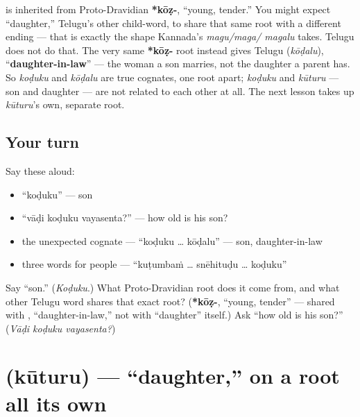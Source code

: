 \begin{cousinweb}
\textbf{} is inherited from Proto-Dravidian \textbf{*kōẓ-}, \textquotedblleft{}young, tender.\textquotedblright{} You might expect \textquotedblleft{}daughter,\textquotedblright{} Telugu's other child-word, to share that same root with a different ending — that is exactly the shape Kannada's \emph{magu/maga/ magalu} takes. Telugu does not do that. The very same \textbf{*kōẓ-} root instead gives Telugu \textbf{} (\emph{kōḍalu}), \textquotedblleft{}\textbf{daughter-in-law}\textquotedblright{} — the woman a son marries, not the daughter a parent has. So \emph{koḍuku} and \emph{kōḍalu} are true cognates, one root apart; \emph{koḍuku} and \emph{kūturu} — son and daughter — are not related to each other at all. The next lesson takes up \emph{kūturu}'s own, separate root.
\end{cousinweb}

\subsection*{Your turn}
Say these aloud:

\begin{itemize}
\raggedright
  \item \textquotedblleft{}koḍuku\textquotedblright{} — son
  \item \textquotedblleft{}vāḍi koḍuku vayasenta?\textquotedblright{} — how old is his son?
  \item the unexpected cognate — \textquotedblleft{}koḍuku … kōḍalu\textquotedblright{} — son, daughter-in-law
  \item three words for people — \textquotedblleft{}kuṭumbaṁ … snēhituḍu … koḍuku\textquotedblright{}
\end{itemize}

\begin{tcolorbox}[breakable,colback=teal!4,colframe=teal!35!black,title={Before you move on}]
Say \textquotedblleft{}son.\textquotedblright{} (\emph{Koḍuku}.) What Proto-Dravidian root does it come from, and what other Telugu word shares that exact root? (\textbf{*kōẓ-}, \textquotedblleft{}young, tender\textquotedblright{} — shared with \textbf{}, \textquotedblleft{}daughter-in-law,\textquotedblright{} not with \textquotedblleft{}daughter\textquotedblright{} itself.) Ask \textquotedblleft{}how old is his son?\textquotedblright{} (\emph{Vāḍi koḍuku vayasenta?})
\end{tcolorbox}
\section[\texorpdfstring{\te{కూతురు} (kūturu)}{కూతురు (kūturu)}]{ (kūturu) — \textquotedblleft{}daughter,\textquotedblright{} on a root all its own}

